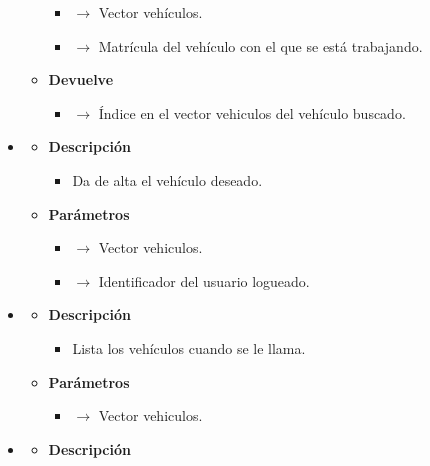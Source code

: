 \begin{itemize}
\begin{itemize}
		\begin{itemize}
			\item {} $\rightarrow$ Vector vehículos.
            \item {} $\rightarrow$ Matrícula del vehículo con el que se está trabajando.
		\end{itemize}
        \item \textbf{Devuelve}
		\begin{itemize}
			\item {} $\rightarrow$ Índice en el vector vehiculos del vehículo buscado.
		\end{itemize}
	\end{itemize}
    \item{}
	\begin{itemize}
		\item \textbf{Descripción}
        \begin{itemize}
			\item Da de alta el vehículo deseado.
		\end{itemize}
        \item \textbf{Parámetros}
		\begin{itemize}
			\item {} $\rightarrow$ Vector vehiculos.
            \item {} $\rightarrow$ Identificador del usuario logueado.
		\end{itemize}
	\end{itemize}
	\item{}
	\begin{itemize}
		\item \textbf{Descripción}
        \begin{itemize}
			\item Lista los vehículos cuando se le llama.
		\end{itemize}
        \item \textbf{Parámetros}
		\begin{itemize}
			\item {} $\rightarrow$ Vector vehiculos.
		\end{itemize}
	\end{itemize}
    \item{}
	\begin{itemize}
		\item \textbf{Descripción}
        \begin{itemize}

\end{itemize}
\end{itemize}
\end{itemize}
